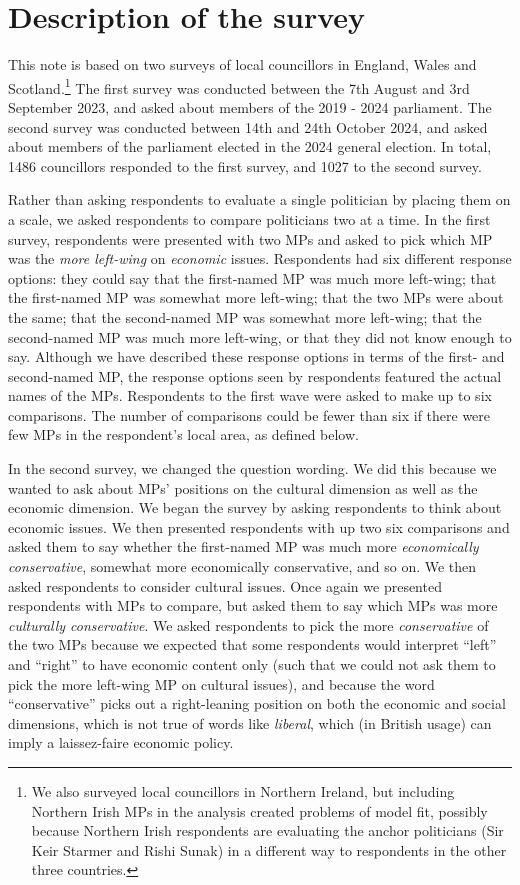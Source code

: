 \documentclass[
]{article}
\begin{document}
\section{Description of the survey}\label{description-of-the-survey}

This note is based on two surveys of local councillors in England, Wales
and Scotland.\footnote{We also surveyed local councillors in Northern
  Ireland, but including Northern Irish MPs in the analysis created
  problems of model fit, possibly because Northern Irish respondents are
  evaluating the anchor politicians (Sir Keir Starmer and Rishi Sunak)
  in a different way to respondents in the other three countries.} The
first survey was conducted between the 7th August and 3rd September
2023, and asked about members of the 2019 - 2024 parliament. The second
survey was conducted between 14th and 24th October 2024, and asked about
members of the parliament elected in the 2024 general election. In
total, 1486 councillors responded to the first survey, and 1027 to the
second survey.

Rather than asking respondents to evaluate a single politician by
placing them on a scale, we asked respondents to compare politicians two
at a time. In the first survey, respondents were presented with two MPs
and asked to pick which MP was the \emph{more left-wing} on
\emph{economic} issues. Respondents had six different response options:
they could say that the first-named MP was much more left-wing; that the
first-named MP was somewhat more left-wing; that the two MPs were about
the same; that the second-named MP was somewhat more left-wing; that the
second-named MP was much more left-wing, or that they did not know
enough to say. Although we have described these response options in
terms of the first- and second-named MP, the response options seen by
respondents featured the actual names of the MPs. Respondents to the
first wave were asked to make up to six comparisons. The number of
comparisons could be fewer than six if there were few MPs in the
respondent's local area, as defined below.

In the second survey, we changed the question wording. We did this
because we wanted to ask about MPs' positions on the cultural dimension
as well as the economic dimension. We began the survey by asking
respondents to think about economic issues. We then presented
respondents with up two six comparisons and asked them to say whether
the first-named MP was much more \emph{economically conservative},
somewhat more economically conservative, and so on. We then asked
respondents to consider cultural issues. Once again we presented
respondents with MPs to compare, but asked them to say which MPs was
more \emph{culturally conservative}. We asked respondents to pick the
more \emph{conservative} of the two MPs because we expected that some
respondents would interpret ``left'' and ``right'' to have economic
content only (such that we could not ask them to pick the more left-wing
MP on cultural issues), and because the word ``conservative'' picks out
a right-leaning position on both the economic and social dimensions,
which is not true of words like \emph{liberal}, which (in British usage)
can imply a laissez-faire economic policy.
\end{document}

